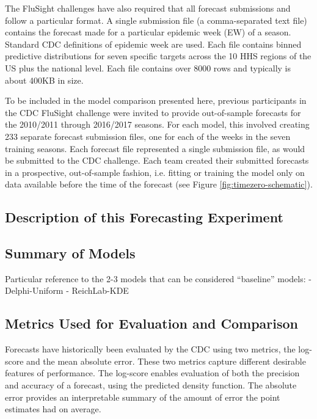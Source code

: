 \documentclass{article}
\begin{document}
The FluSight challenges have also required that all forecast submissions and follow a particular format. A single submission file (a comma-separated text file) contains the forecast made for a particular epidemic week (EW) of a season. Standard CDC definitions of epidemic week are used. Each file contains binned predictive distributions for seven specific targets across the 10 HHS regions of the US plus the national level. Each file contains over 8000 rows and typically is about 400KB in size.

To be included in the model comparison presented here, previous participants in the CDC FluSight challenge were invited to provide out-of-sample forecasts for the 2010/2011 through 2016/2017 seasons. For each model, this involved creating 233 separate forecast submission files, one for each of the weeks in the seven training seasons.
Each forecast file represented a single submission file, as would be submitted to the CDC challenge. 
Each team created their submitted forecasts in a prospective, out-of-sample fashion, i.e. fitting or training the model only on data available before the time of the forecast (see Figure \ref{fig:timezero-schematic}). 

\subsection{Description of this Forecasting Experiment}


\subsection{Summary of Models}

Particular reference to the 2-3 models that can be considered ``baseline'' models:
 - Delphi-Uniform
 - ReichLab-KDE


\subsection{Metrics Used for Evaluation and Comparison}

Forecasts have historically been evaluated by the CDC using two metrics, the log-score and the mean absolute error. These two metrics capture different desirable features of performance. The log-score enables evaluation of both the precision and accuracy of a forecast, using the predicted density function.\cite{Gneiting2007} The absolute error provides an interpretable summary of the amount of error the point estimates had on average.\cite{Reich2016} 
\end{document}
